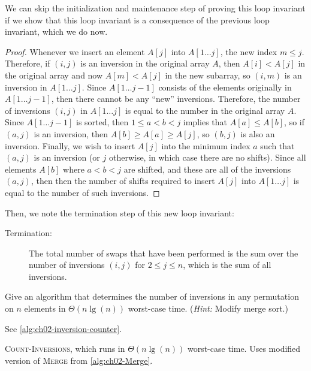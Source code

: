 \documentclass[Chapter02]{subfiles}
\begin{document}
\begin{problems}
\begin{problems}
\begin{answer}
				We can skip the initialization and maintenance step of proving this loop invariant if we show that this loop invariant is a consequence of the previous loop invariant, which we do now.
				\begin{proof}
					Whenever we insert an element $A[j]$ into $A[1 \dots j]$, the new index $m \leq j$. Therefore, if $(i,j)$ is an inversion in the original array $A$, then $A[i] < A[j]$ in the original array and now $A[m] < A[j]$ in the new subarray, so $(i,m)$ is an inversion in $A[1 \dots j]$. Since $A[1 \dots j - 1]$ consists of the elements originally in $A[1 \dots j-1]$, then there cannot be any ``new'' inversions. Therefore, the number of inversions $(i, j)$ in $A[1 \dots j]$ is equal to the number in the original array $A$. Since $A[1 \dots j-1]$ is sorted, then $1 \leq a < b < j$ implies that $A[a] \leq A[b]$, so if $(a,j)$ is an inversion, then $A[b] \geq A[a] \geq A[j]$, so $(b, j)$ is also an inversion. Finally, we wish to insert $A[j]$ into the minimum index $a$ such that $(a,j)$ is an inversion (or $j$ otherwise, in which case there are no shifts). Since all elements $A[b]$ where $a < b < j$ are shifted, and these are all of the inversions $(a,j)$, then then the number of shifts required to insert $A[j]$ into $A[1 \dots j]$ is equal to the number of such inversions.
				\end{proof}

				Then, we note the termination step of this new loop invariant:
				\begin{description}
					\item[Termination:] The total number of swaps that have been performed is the sum over the number of inversions $(i,j)$ for $2 \leq j \leq n$, which is the sum of all inversions.
				\end{description}
			\end{answer}
			
			\item Give an algorithm that determines the number of inversions in any permutation on $n$ elements in $\Theta(n \lg(n))$ worst-case time. (\emph{Hint:} Modify merge sort.)
			\begin{answer}
				See \cref{alg:ch02-inversion-counter}.

				\begin{algorithm}[H]
					\caption{\textsc{Count-Inversions}, which runs in $\Theta(n \lg(n))$ worst-case time. Uses modified version of \textsc{Merge} from \cref{alg:ch02-Merge}.}
					\label{alg:ch02-inversion-counter}


\end{algorithm}
\end{answer}
\end{problems}
\end{problems}
\end{document}
